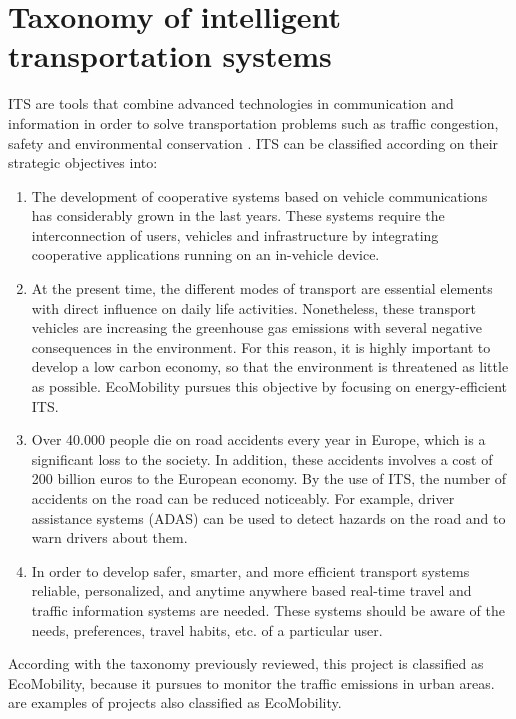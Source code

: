 \section{Taxonomy of intelligent transportation systems}
\ac{ITS} are tools that combine advanced technologies in communication and information in order to solve transportation problems such as traffic congestion, safety and environmental conservation \cite{San15}. \ac{ITS} can be classified according on their strategic objectives \cite{Rafiq201345} into:
\begin{enumerate}
	\item {} The development of cooperative systems based on vehicle communications has considerably grown in the last years. These systems require the interconnection of users, vehicles and infrastructure by integrating cooperative applications running on an in-vehicle device.
	
	\item {} At the present time, the different modes of transport are essential elements with direct influence on daily life activities. Nonetheless, these transport vehicles are increasing the greenhouse gas emissions with several negative consequences in the environment. For this reason, it is highly important to develop a low carbon economy, so that the environment is threatened as little as possible. EcoMobility pursues this objective by focusing on energy-efficient \ac{ITS}.
	
	\item {} Over 40.000 people die on road accidents every year in Europe, which is a significant loss to the society. In addition, these accidents involves a cost of 200 billion euros to the European economy. By the use of \ac{ITS}, the number of accidents on the road can be reduced noticeably. For example, driver assistance systems (ADAS) can be used to detect hazards on the road and to warn drivers about them.
	
	\item {} In order to develop safer, smarter, and more efficient transport systems reliable, personalized, and anytime anywhere based real-time travel and traffic information systems are needed. These systems should be aware of the needs, preferences, travel habits, etc. of a particular user.
\end{enumerate}

According with the taxonomy previously reviewed, this project is classified as EcoMobility, because it pursues to monitor the traffic emissions in urban areas. \cite{ADASIS,eCo-MOVe, NAVARRO2016314} are examples of projects also classified as EcoMobility.

